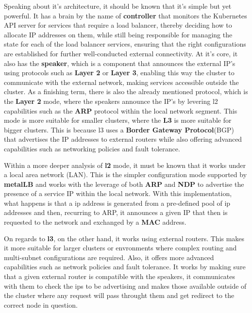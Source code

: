 Speaking about it's architecture, it should be known that it's simple but yet powerful. It has a brain by the name of \textbf{controller} that monitors the Kubernetes API server for services that require a load balancer, thereby deciding how to allocate IP addresses on them, while still being responsible for managing the state for each of the load balancer services, ensuring that the right configurations are established for further well-conducted external connectivity. At it's core, it also has the \textbf{speaker}, which is a component that announces the external IP's using protocols such as \textbf{Layer 2} or \textbf{Layer 3}, enabling this way the cluster to communicate with the external network, making services accessible outside the cluster. As a finishing term, there is also the already mentioned protocol, which is the \textbf{Layer 2} mode, where the speakers announce the IP's by levering l2 capabilities such as the \textbf{ARP} \cite{arp} protocol within the local network segment. This mode is more suitable for smaller clusters, where the \textbf{L3} is more suitable for bigger clusters. This is because l3 uses a \textbf{Border Gateway Protocol}(BGP) \cite{bgp} \cite{bgp2} that advertises the IP addresses to external routers while also offering advanced capabilities such as networking policies and fault tolerance.

Within a more deeper analysis of \textbf{l2} mode, it must be known that it works under a local area network (LAN). This is the simpler configuration mode supported by \textbf{metalLB} and works with the leverage of both \textbf{ARP} and \textbf{NDP} to advertise the presence of a service IP within the local network. With this implementation, what happens is that a ip address is generated from a pre-defined pool of ip addresses and then, recurring to ARP, it announces a given IP that then is requested to the network and exchanged by a \textbf{MAC} address.

On regards to \textbf{l3}, on the other hand, it works using external routers. This makes it more suitable for larger clusters or envronments where complex routing and multi-subnet configurations are required. Also, it offers more advanced capabilities such as network policies and fault tolerance. It works by making sure that a given external router is compatible with the speakers, it communicates with them to check the ips to be advertising and makes those available outside of the cluster where any request will pass throught them and get redirect to the correct node in question.


